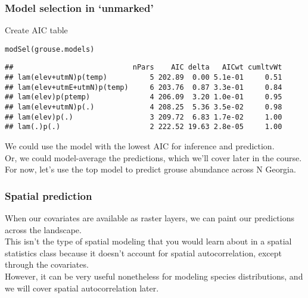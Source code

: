 \documentclass[color=usenames,dvipsnames]{beamer}\usepackage[]{graphicx}\usepackage[]{color}
\makeatletter
\newcommand{\hlstd}[1]{\textcolor[rgb]{0,0,0}{#1}}%
\newcommand{\hlkwd}[1]{\textcolor[rgb]{0.004,0.004,0.506}{#1}}%
\newenvironment{kframe}{%
 \def\at@end@of@kframe{}%
 \ifinner\ifhmode%
  \def\at@end@of@kframe{\end{minipage}}%
  \begin{minipage}{\columnwidth}%
 \fi\fi%
 \def\FrameCommand##1{\hskip\@totalleftmargin \hskip-\fboxsep
 \colorbox{shadecolor}{##1}\hskip-\fboxsep
     \hskip-\linewidth \hskip-\@totalleftmargin \hskip\columnwidth}%
 \MakeFramed {\advance\hsize-\width
   \@totalleftmargin\z@ \linewidth\hsize
   \@setminipage}}%
 {\par\unskip\endMakeFramed%
 \at@end@of@kframe}
\newenvironment{knitrout}{}{} %
\makeatother
\begin{document}
\begin{frame}[fragile]
  \frametitle{Model selection in `unmarked'}
  \small
  Create AIC table
\begin{knitrout}\scriptsize
{}\color{fgcolor}\begin{kframe}
\begin{alltt}
\hlkwd{modSel}\hlstd{(grouse.models)}
\end{alltt}
\begin{verbatim}
##                            nPars    AIC delta   AICwt cumltvWt
## lam(elev+utmN)p(temp)          5 202.89  0.00 5.1e-01     0.51
## lam(elev+utmE+utmN)p(temp)     6 203.76  0.87 3.3e-01     0.84
## lam(elev)p(ptemp)              4 206.09  3.20 1.0e-01     0.95
## lam(elev+utmN)p(.)             4 208.25  5.36 3.5e-02     0.98
## lam(elev)p(.)                  3 209.72  6.83 1.7e-02     1.00
## lam(.)p(.)                     2 222.52 19.63 2.8e-05     1.00
\end{verbatim}
\end{kframe}
\end{knitrout}
  \pause
  \vfill
  We could use the model with the lowest AIC for inference and
  prediction. \\ 
  \pause
  \vfill
  Or, we could model-average the predictions, which we'll cover later
  in the course. \\
  \pause
  \vfill
  For now, let's use the top model to predict grouse abundance across
  N Georgia.
\end{frame}




\begin{frame}
  \frametitle{Spatial prediction}
  When our covariates are available as raster layers, we can paint our
  predictions across the landscape. \\
  \pause
  \vfill
  This isn't the type of spatial modeling that you would learn about
  in a spatial statistics class because it doesn't account for spatial
  autocorrelation, except through the covariates. \\
  \pause
  \vfill
  However, it can be very useful nonetheless for modeling species
  distributions, and we will cover spatial autocorrelation later. 
\end{frame}
\end{document}
